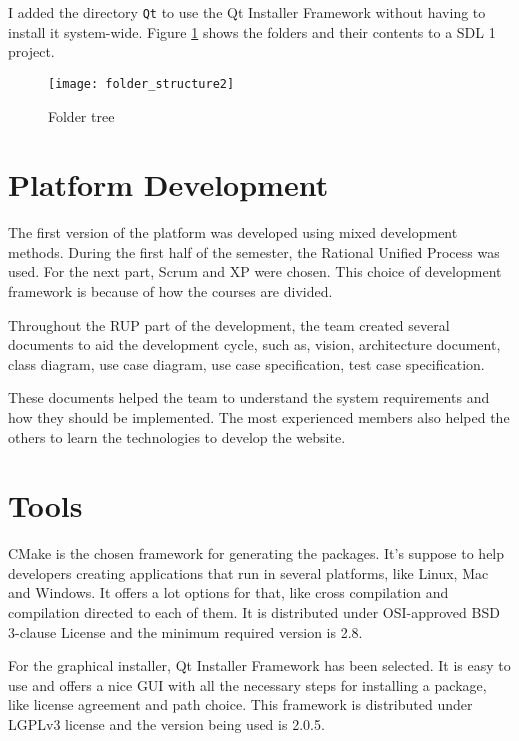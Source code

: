 I added the directory \texttt{Qt} to use the Qt Installer Framework without having to install it system-wide. Figure \ref{fig:folder_structure} shows the folders and their contents to a SDL 1 project.

\begin{figure}[h!]
\centering
\texttt{[image: folder\_structure2]}
\caption{Folder tree}
\label{fig:folder_structure}
\end{figure}

\section{Platform Development}
\label{sec:platform}

The first version of the platform was developed using mixed development methods. During the first half of the semester, the Rational Unified Process was used. For the next part, Scrum and XP were chosen. This choice of development framework is because of how the courses are divided.

Throughout the RUP part of the development, the team created several documents to aid the development cycle, such as, vision, architecture document, class diagram, use case diagram, use case specification, test case specification.

These documents helped the team to understand the system requirements and how they should be implemented. The most experienced members also helped the others to learn the technologies to develop the website.


\section{Tools}
\label{sec:tools}

CMake is the chosen framework for generating the packages. It's suppose to help developers creating applications that run in several platforms, like Linux, Mac and Windows. It offers a lot options for that, like cross compilation and compilation directed to each of them. It is distributed under OSI-approved BSD 3-clause License and the minimum required version is 2.8.

For the graphical installer, Qt Installer Framework has been selected. It is easy to use and offers a nice GUI with all the necessary steps for installing a package, like license agreement and path choice. This framework is distributed under LGPLv3 license and the version being used is 2.0.5.

